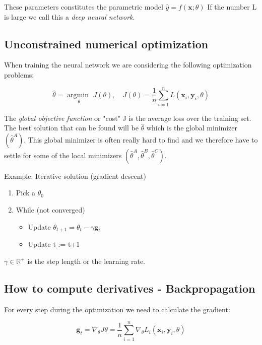 These parameters constitutes the parametric model $\hat{y} = f(\textbf{x};\textbf{$\theta$})$ If the number L is large we call this a \emph{deep neural network}.

\subsection*{Unconstrained numerical optimization}
When training the neural network we are considering the following optimization problems: 

	\begin{equation}
		\hat{\textbf{$\theta$}} = \underset{\theta}{\arg \text{min }}J(\textbf{$\theta$}), \quad J(\textbf{$\theta$}) = \frac{1} {n}\sum_{i=1}^{n}L(\textbf{x}_i, \textbf{y}_i, \textbf{$\theta$}) 
	\end{equation}

The \emph{global objective function} or "cost" J is the average loss over the training set. The best solution that can be found will be $\hat{\textbf{$\theta$}}$ which is the global minimizer $(\hat{\textbf{$\theta$}}^{A})$. This global minimizer is often really hard to find and we therefore have to settle for some of the local minimizers $(\hat{\textbf{$\theta$}}^{A},\hat{\textbf{$\theta$}}^{B},\hat{\textbf{$\theta$}}^{C})$. 

\begin{example}{Example: Iterative solution (gradient descent)}
\begin{enumerate}
	\item Pick a $\theta_0$
	\item While (not converged)
		\begin{itemize}
			\item Update $\theta_{t+1} = \theta_t - \gamma \textbf{g}_t$
			\item Update t := t+1 
		\end{itemize}
\end{enumerate}
$\gamma \in \mathbb{R}^{+}$ is the step length or the learning rate.
\end{example}	


\subsection*{How to compute derivatives - Backpropagation}
For every step during the optimization we need to calculate the gradient:

	\begin{equation}
		\textbf{g}_t = \nabla_\theta J{\theta} = \frac{1} {n} \sum_{i=1}^{n}\nabla_\theta L_i(\textbf{x}_i,\textbf{y}_i, \theta)
	\end{equation}

